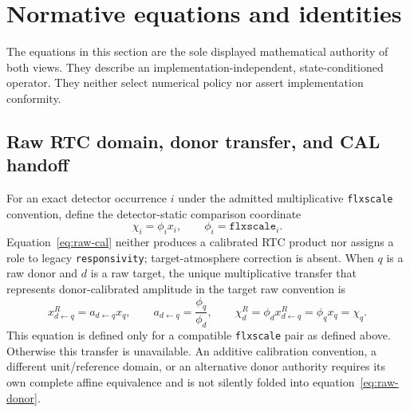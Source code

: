 \section{Normative equations and identities}
\label{sec:core-equations}

The equations in this section are the sole displayed mathematical authority
of both views.  They describe an implementation-independent, state-conditioned
operator.  They neither select numerical policy nor assert implementation
conformity.

\subsection{Raw RTC domain, donor transfer, and CAL handoff}

For an exact detector occurrence $i$ under the admitted multiplicative
\texttt{flxscale} convention, define the detector-static comparison coordinate
\begin{equation}
 \chi_i=\phi_i x_i,
 \qquad \phi_i=\texttt{flxscale}_i .
 \tag{SCI-RTC-EQ-001}\label{eq:raw-cal}
\end{equation}
Equation~\eqref{eq:raw-cal} neither produces a calibrated RTC product nor
assigns a role to legacy \texttt{responsivity}; target-atmosphere correction
is absent.  When $q$ is a raw donor and $d$ is a raw target, the
unique multiplicative transfer that represents donor-calibrated amplitude in
the target raw convention is
\begin{equation}
 x^{R}_{d\leftarrow q}
   =a_{d\leftarrow q}x_q,
 \qquad
 a_{d\leftarrow q}=\frac{\phi_q}{\phi_d},
 \qquad
 \chi^R_d=\phi_d x^{R}_{d\leftarrow q}=\phi_qx_q=\chi_q .
 \tag{SCI-RTC-EQ-002}\label{eq:raw-donor}
\end{equation}
This equation is defined only for a compatible \texttt{flxscale} pair as
defined above.  Otherwise this transfer is unavailable.  An
additive calibration convention, a different unit/reference domain, or an
alternative donor authority requires its own complete affine equivalence and
is not silently folded into equation~\eqref{eq:raw-donor}.

